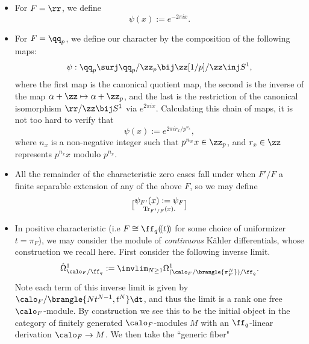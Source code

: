 \documentclass[11pt, x11names, openany]{book}
\begin{document}
\begin{itemize}
    \item For $F = \rr$, we define
    \begin{equation}
        \label{eqn: standard character on R}
        \psi(x) := e^{- 2\pi i x}.
    \end{equation}
    \item For $F = \qq_p$, we define our character by the composition of the following maps:
    \begin{equation*}
        \psi: \qq_p \surj \qq_p/\zz_p \bij \zz[1/p]/\zz \inj S^1,
    \end{equation*}
    where the first map is the canonical quotient map, the second is the inverse of the map $\alpha + \zz \mapsto \alpha + \zz_p$, and the last is the restriction of the canonical isomorphism $\rr/\zz \bij S^1$ via $e^{2 \pi i x}$. Calculating this chain of maps, it is not too hard to verify that
    \begin{equation}
        \label{eqn: standard character on Q_p}
        \psi(x) := e^{2 \pi i r_x /p^{n_x}},
    \end{equation}
    where $n_x$ is a non-negative integer such that $p^{n_x} x \in \zz_p$, and $r_x \in \zz$ represents $p^{n_x} x$ modulo $p^{n_x}$.
    \item All the remainder of the characteristic zero cases fall under when $F'/F$ a finite separable extension of any of the above $F$, so we may define
    \begin{equation}
        \label{eqn: standard character on any local field}
        \psi_{F'}(x) := \psi_F \brack{\operatorname{Tr}_{F'/F} (x)}.
    \end{equation}
    \item In positive characteristic (i.e $F \cong \ff_q(\!(t)\!)$ for some choice of uniformizer $t = \pi_F$), we may consider the module of \textit{continuous} K\"ahler differentials, whose construction we recall here. First consider the following inverse limit.
    \begin{equation*}
       \hat{\Omega}^1_{\calo_F/\ff_q} := \invlim_{N \geq 1} \Omega^1_{(\calo_F/\brangle{\pi_F^N})/\ff_q}.
    \end{equation*}
    Note each term of this inverse limit is given by $\calo_F/ \brangle{N t^{N-1}, t^N} \dt$, and thus the limit is a rank one free $\calo_F$-module. By construction we see this to be the initial object in the category of finitely generated $\calo_F$-modules $M$ with an $\ff_q$-linear derivation $\calo_F \to M$. We then take the ``generic fiber"

\end{itemize}
\end{document}
